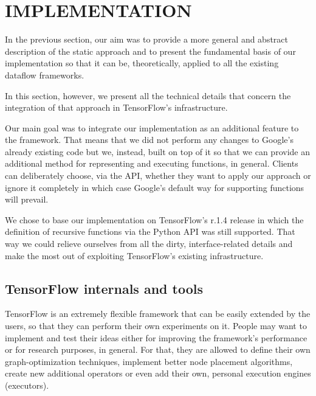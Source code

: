 \documentclass[ack,preface]{dithesis}
\begin{document}
\chapter{IMPLEMENTATION}
In the previous section, our aim was to provide a more general and abstract description of the static approach and to present the fundamental basis of our implementation so that it can be, theoretically, applied to all the existing dataflow frameworks. 

In this section, however, we present all the technical details that concern the integration of that approach in TensorFlow's infrastructure.

Our main goal was to integrate our implementation as an additional feature to the framework. That means that we did not perform any changes to Google's already existing code but we, instead, built on top of it so that we can provide an additional method for representing and executing functions, in general. Clients can deliberately choose, via the API, whether they want to apply our approach or ignore it completely in which case Google's default way for supporting functions will prevail.

We chose to base our implementation on TensorFlow's r.1.4 release in which the definition of recursive functions via the Python API was still supported. That way we could relieve ourselves from all the dirty, interface-related details and make the most out of exploiting TensorFlow's existing infrastructure.  

    \section{TensorFlow internals and tools}

TensorFlow is an extremely flexible framework that  can be easily extended by the users, so that they can perform their own experiments on it. People may want to implement and test their  ideas either for improving the framework's performance or for research purposes, in general. For that, they are allowed to define their own graph-optimization techniques, implement better node placement algorithms, create new additional operators or even add their own, personal execution engines (executors).
\end{document}
